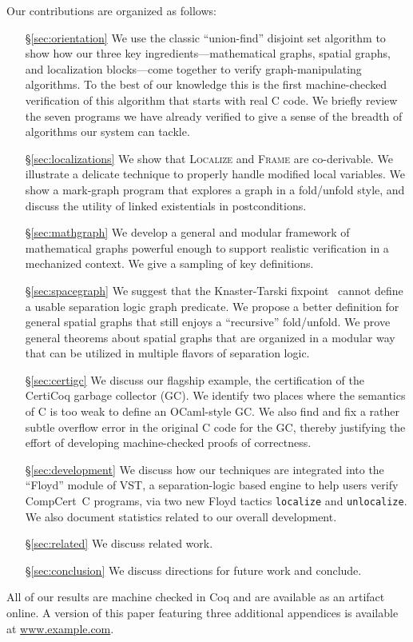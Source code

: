 \documentclass[acmsmall,screen]{acmart}
\newcommand{\li}[1]{{\texttt{\small #1}}}
\begin{document}
Our contributions are organized as follows:
\begin{itemize}
\item[\S\ref{sec:orientation}] We use the classic ``union-find'' disjoint set algorithm to show how our three key ingredients---mathematical graphs, spatial graphs, and localization blocks---come together to verify
graph-manipulating algorithms.
To the best of our knowledge this is the first machine-checked verification of this algorithm that starts with real C code.
We briefly review the seven programs we have already verified to give a sense 
of the breadth of algorithms our system can tackle.
\item[\S\ref{sec:localizations}] We show that \textsc{Localize} and \textsc{Frame} are co-derivable.  We illustrate a delicate technique to properly handle modified 
local variables. We show a mark-graph
program that explores a graph in a fold/unfold style, and discuss the utility of linked
existentials in postconditions.  

\item[\S\ref{sec:mathgraph}] We develop a general and modular framework of mathematical graphs powerful enough to support realistic verification in a mechanized context.  We give a sampling of key definitions.
\item[\S\ref{sec:spacegraph}] We suggest that the Knaster-Tarski fixpoint~\cite{tarski:fixpoint} cannot define a usable separation logic graph predicate.  We propose a better definition for general spatial graphs that still enjoys a ``recursive'' fold/unfold.  We prove general theorems about spatial graphs that are 
organized in a modular way that can be utilized in multiple flavors of separation logic. \item[\S\ref{sec:certigc}] We discuss our flagship example, the certification of the CertiCoq garbage collector (GC). We identify two places where the semantics of C is too weak to define an OCaml-style GC. We also find and fix a rather subtle overflow error in the original C code for the GC, thereby justifying the effort of developing machine-checked proofs of correctness.
\item[\S\ref{sec:development}] We discuss how our techniques are integrated into the
``Floyd'' module of VST, a separation-logic based engine to help users verify
CompCert~C programs, via two new Floyd tactics \li{localize} and \li{unlocalize}.
We also document statistics related to our overall development.
\item[\S\ref{sec:related}] We discuss related work.
\item[\S\ref{sec:conclusion}] We discuss directions for future work and conclude.
\end{itemize}
All of our results are machine checked in Coq and are available as an artifact online.
A version of this paper featuring three additional appendices is available 
at \href{www.example.com}{www.example.com}.
 
\end{document}
